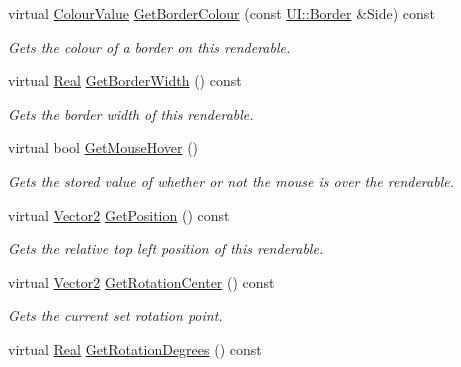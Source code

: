 \begin{DoxyCompactItemize}
virtual \hyperlink{classMezzanine_1_1ColourValue}{ColourValue} \hyperlink{classMezzanine_1_1UI_1_1Rectangle_a41c1a24d9c615cabbccb9a71e6f28e66}{GetBorderColour} (const \hyperlink{namespaceMezzanine_1_1UI_a060de8b459e4991f4a1627166079c406}{UI::Border} \&Side) const 
\begin{DoxyCompactList}\small\item\em Gets the colour of a border on this renderable. \item\end{DoxyCompactList}\item 
virtual \hyperlink{namespaceMezzanine_a726731b1a7df72bf3583e4a97282c6f6}{Real} \hyperlink{classMezzanine_1_1UI_1_1Rectangle_afd59e442de88083fa432714ec2486bcc}{GetBorderWidth} () const 
\begin{DoxyCompactList}\small\item\em Gets the border width of this renderable. \item\end{DoxyCompactList}\item 
virtual bool \hyperlink{classMezzanine_1_1UI_1_1Rectangle_aa55d6bb667692c4b94bbc8c749851e76}{GetMouseHover} ()
\begin{DoxyCompactList}\small\item\em Gets the stored value of whether or not the mouse is over the renderable. \item\end{DoxyCompactList}\item 
virtual \hyperlink{classMezzanine_1_1Vector2}{Vector2} \hyperlink{classMezzanine_1_1UI_1_1Rectangle_a8df1f5fbba85a0a6f252ae470ce93c07}{GetPosition} () const 
\begin{DoxyCompactList}\small\item\em Gets the relative top left position of this renderable. \item\end{DoxyCompactList}\item 
virtual \hyperlink{classMezzanine_1_1Vector2}{Vector2} \hyperlink{classMezzanine_1_1UI_1_1Rectangle_ac8d1a3c0f7584812e00ef2d1688d20aa}{GetRotationCenter} () const 
\begin{DoxyCompactList}\small\item\em Gets the current set rotation point. \item\end{DoxyCompactList}\item 
virtual \hyperlink{namespaceMezzanine_a726731b1a7df72bf3583e4a97282c6f6}{Real} \hyperlink{classMezzanine_1_1UI_1_1Rectangle_a6049b39f58d294ae2ae5256889d79311}{GetRotationDegrees} () const 

\end{DoxyCompactItemize}
